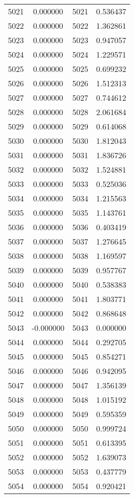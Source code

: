 \documentclass[12pt]{article}
\begin{document}
\begin{longtable}{@{}cccc@{}}
5021 & 0.000000 & 5021 & 0.536437 \\
5022 & 0.000000 & 5022 & 1.362861 \\
5023 & 0.000000 & 5023 & 0.947057 \\
5024 & 0.000000 & 5024 & 1.229571 \\
5025 & 0.000000 & 5025 & 0.699232 \\
5026 & 0.000000 & 5026 & 1.512313 \\
5027 & 0.000000 & 5027 & 0.744612 \\
5028 & 0.000000 & 5028 & 2.061684 \\
5029 & 0.000000 & 5029 & 0.614068 \\
5030 & 0.000000 & 5030 & 1.812043 \\
5031 & 0.000000 & 5031 & 1.836726 \\
5032 & 0.000000 & 5032 & 1.524881 \\
5033 & 0.000000 & 5033 & 0.525036 \\
5034 & 0.000000 & 5034 & 1.215563 \\
5035 & 0.000000 & 5035 & 1.143761 \\
5036 & 0.000000 & 5036 & 0.403419 \\
5037 & 0.000000 & 5037 & 1.276645 \\
5038 & 0.000000 & 5038 & 1.169597 \\
5039 & 0.000000 & 5039 & 0.957767 \\
5040 & 0.000000 & 5040 & 0.538383 \\
5041 & 0.000000 & 5041 & 1.803771 \\
5042 & 0.000000 & 5042 & 0.868648 \\
5043 & -0.000000 & 5043 & 0.000000 \\
5044 & 0.000000 & 5044 & 0.292705 \\
5045 & 0.000000 & 5045 & 0.854271 \\
5046 & 0.000000 & 5046 & 0.942095 \\
5047 & 0.000000 & 5047 & 1.356139 \\
5048 & 0.000000 & 5048 & 1.015192 \\
5049 & 0.000000 & 5049 & 0.595359 \\
5050 & 0.000000 & 5050 & 0.999724 \\
5051 & 0.000000 & 5051 & 0.613395 \\
5052 & 0.000000 & 5052 & 1.639073 \\
5053 & 0.000000 & 5053 & 0.437779 \\
5054 & 0.000000 & 5054 & 0.920421 \\

\end{longtable}
\end{document}
